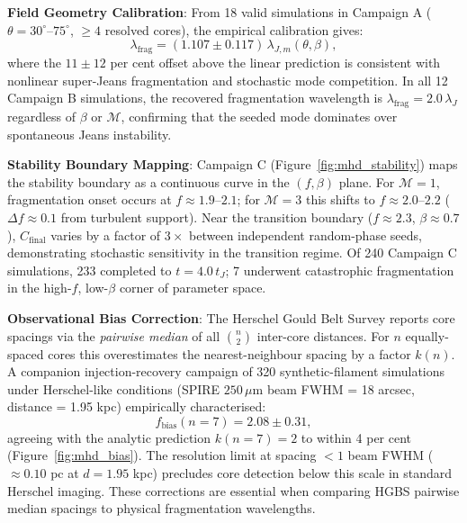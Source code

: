 \documentclass[usenatbib]{rasti}
\begin{document}
\textbf{Field Geometry Calibration}: From 18 valid simulations in Campaign A ($\theta =
30^\circ$--$75^\circ$, $\geq 4$ resolved cores), the empirical calibration gives:
\begin{equation}
\lambda_\mathrm{frag} = (1.107 \pm 0.117)\,\lambda_{J,m}(\theta,\beta),
\label{eq:calib}
\end{equation}
where the $11 \pm 12$ per cent offset above the linear prediction is consistent with
nonlinear super-Jeans fragmentation and stochastic mode competition. In all 12
Campaign B simulations, the recovered fragmentation wavelength is $\lambda_\mathrm{frag}
= 2.0\,\lambda_J$ regardless of $\beta$ or $\mathcal{M}$, confirming that the seeded
mode dominates over spontaneous Jeans instability.

\textbf{Stability Boundary Mapping}: Campaign C (Figure~\ref{fig:mhd_stability}) maps the
stability boundary as a continuous curve in the $(f, \beta)$ plane. For $\mathcal{M} = 1$,
fragmentation onset occurs at $f \approx 1.9$--$2.1$; for $\mathcal{M} = 3$ this shifts to
$f \approx 2.0$--$2.2$ ($\Delta f \approx 0.1$ from turbulent support). Near the transition
boundary ($f \approx 2.3$, $\beta \approx 0.7$), $C_\mathrm{final}$ varies by a factor of
$3\times$ between independent random-phase seeds, demonstrating stochastic sensitivity in
the transition regime. Of 240 Campaign C simulations, 233 completed to $t = 4.0\,t_J$; 7
underwent catastrophic fragmentation in the high-$f$, low-$\beta$ corner of parameter space.

\textbf{Observational Bias Correction}: The Herschel Gould Belt Survey reports core spacings
via the \emph{pairwise median} of all $\binom{n}{2}$ inter-core distances. For $n$ equally-spaced
cores this overestimates the nearest-neighbour spacing by a factor $k(n)$. A companion
injection-recovery campaign of 320 synthetic-filament simulations under Herschel-like conditions
(SPIRE $250\,\mu$m beam FWHM = 18 arcsec, distance = 1.95 kpc) empirically characterised:
\begin{equation}
f_\mathrm{bias}(n=7) = 2.08 \pm 0.31,
\label{eq:bias}
\end{equation}
agreeing with the analytic prediction $k(n=7) = 2$ to within 4 per cent (Figure~\ref{fig:mhd_bias}). The resolution
limit at spacing $< 1$ beam FWHM ($\approx 0.10$ pc at $d = 1.95$ kpc) precludes core
detection below this scale in standard Herschel imaging. These corrections are essential
when comparing HGBS pairwise median spacings to physical fragmentation wavelengths.
\end{document}
